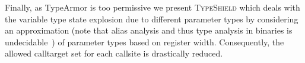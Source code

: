 Finally, as TypeArmor is too permissive we present \textsc{TypeShield} which deals with the variable type state explosion due to different parameter types 
by considering an approximation (note that alias analysis and thus type analysis in binaries is undecidable~\cite{alias:undecidable}) of parameter types based on register width. Consequently, the allowed calltarget set for each callsite is drastically reduced.


